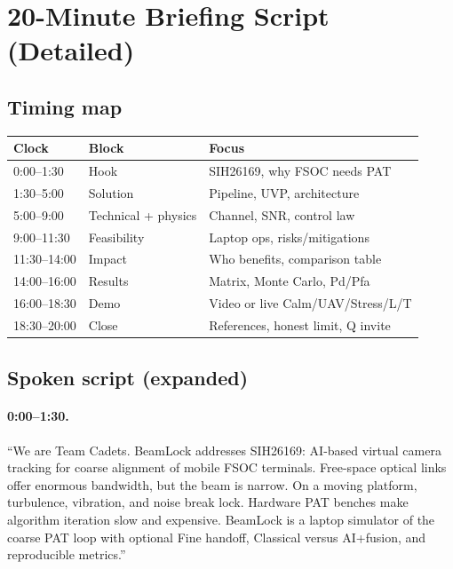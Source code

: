 \documentclass[11pt,a4paper]{article}
\begin{document}
\section{20-Minute Briefing Script (Detailed)}

\subsection{Timing map}
\begin{center}
\begin{tabular}{@{}llp{}@{}}
\toprule
Clock & Block & Focus \\
\midrule
0:00--1:30 & Hook & SIH26169, why FSOC needs PAT \\
1:30--5:00 & Solution & Pipeline, UVP, architecture \\
5:00--9:00 & Technical + physics & Channel, SNR, control law \\
9:00--11:30 & Feasibility & Laptop ops, risks/mitigations \\
11:30--14:00 & Impact & Who benefits, comparison table \\
14:00--16:00 & Results & Matrix, Monte Carlo, Pd/Pfa \\
16:00--18:30 & Demo & Video or live Calm/UAV/Stress/L/T \\
18:30--20:00 & Close & References, honest limit, Q invite \\
\bottomrule
\end{tabular}
\end{center}

\subsection{Spoken script (expanded)}
\paragraph{0:00--1:30.}
``We are Team Cadets. BeamLock addresses SIH26169: AI-based virtual camera tracking for coarse alignment of mobile FSOC terminals.
Free-space optical links offer enormous bandwidth, but the beam is narrow.
On a moving platform, turbulence, vibration, and noise break lock.
Hardware PAT benches make algorithm iteration slow and expensive.
BeamLock is a laptop simulator of the coarse PAT loop with optional Fine handoff, Classical versus AI+fusion, and reproducible metrics.''
\end{document}

